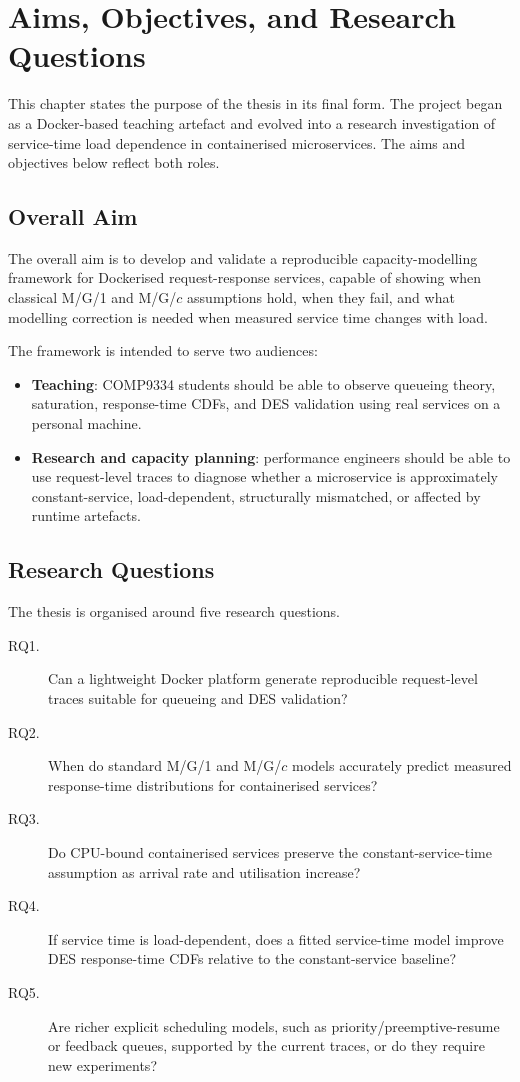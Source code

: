 \chapter{Aims, Objectives, and Research Questions}
\label{ch:aims}

This chapter states the purpose of the thesis in its final form. The project began as a Docker-based teaching artefact and evolved into a research investigation of service-time load dependence in containerised microservices. The aims and objectives below reflect both roles.

\section{Overall Aim}

The overall aim is to develop and validate a reproducible capacity-modelling framework for Dockerised request-response services, capable of showing when classical M/G/1 and M/G/$c$ assumptions hold, when they fail, and what modelling correction is needed when measured service time changes with load.

The framework is intended to serve two audiences:

\begin{itemize}
    \item \textbf{Teaching}: COMP9334 students should be able to observe queueing theory, saturation, response-time CDFs, and DES validation using real services on a personal machine.
    \item \textbf{Research and capacity planning}: performance engineers should be able to use request-level traces to diagnose whether a microservice is approximately constant-service, load-dependent, structurally mismatched, or affected by runtime artefacts.
\end{itemize}

\section{Research Questions}

The thesis is organised around five research questions.

\begin{description}
    \item[RQ1.] Can a lightweight Docker platform generate reproducible request-level traces suitable for queueing and DES validation?
    \item[RQ2.] When do standard M/G/1 and M/G/$c$ models accurately predict measured response-time distributions for containerised services?
    \item[RQ3.] Do CPU-bound containerised services preserve the constant-service-time assumption as arrival rate and utilisation increase?
    \item[RQ4.] If service time is load-dependent, does a fitted service-time model improve DES response-time CDFs relative to the constant-service baseline?
    \item[RQ5.] Are richer explicit scheduling models, such as priority/preemptive-resume or feedback queues, supported by the current traces, or do they require new experiments?
\end{description}

